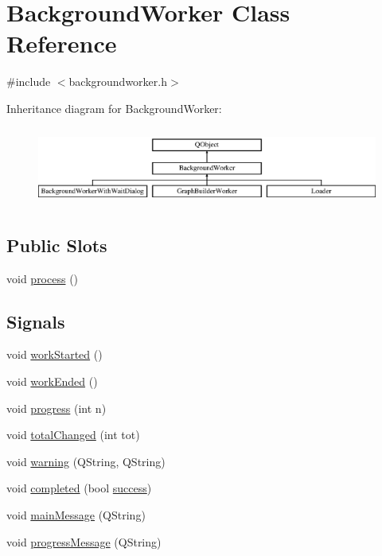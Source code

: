 \hypertarget{class_background_worker}{}\section{Background\+Worker Class Reference}
\label{class_background_worker}


{\ttfamily \#include $<$backgroundworker.\+h$>$}

Inheritance diagram for Background\+Worker\+:\begin{figure}[H]
\begin{center}
\leavevmode
\includegraphics[height=2.629108cm]{d9/d0f/class_background_worker}
\end{center}
\end{figure}
\subsection*{Public Slots}
\begin{DoxyCompactItemize}
\item 
void \mbox{\hyperlink{class_background_worker_ab6dafa5034e430b57db5a19c11ccf201}{process}} ()
\end{DoxyCompactItemize}
\subsection*{Signals}
\begin{DoxyCompactItemize}
\item 
void \mbox{\hyperlink{class_background_worker_a559489f930d9d3a0256da5aa94db440e}{work\+Started}} ()
\item 
void \mbox{\hyperlink{class_background_worker_ace3da9d43ab59836f2e4a9b4de8639ee}{work\+Ended}} ()
\item 
void \mbox{\hyperlink{class_background_worker_a59d894a2cf5ab154e2e2d5c50a9586a9}{progress}} (int n)
\item 
void \mbox{\hyperlink{class_background_worker_a093e5e9146cba387433eefd31acb052d}{total\+Changed}} (int tot)
\item 
void \mbox{\hyperlink{class_background_worker_add703f8509c616b2a81356a0a2821fd2}{warning}} (Q\+String, Q\+String)
\item 
void \mbox{\hyperlink{class_background_worker_a6207f32592e55fb6cbe3f63ecb785b64}{completed}} (bool \mbox{\hyperlink{class_background_worker_a9ccc9c8e6bebdb5714354c6e3207fdee}{success}})
\item 
void \mbox{\hyperlink{class_background_worker_a22b31deec52f477dee5837f80009988a}{main\+Message}} (Q\+String)
\item 
void \mbox{\hyperlink{class_background_worker_aa49e7cf4abd873877213247862f6545c}{progress\+Message}} (Q\+String)
\end{DoxyCompactItemize}

